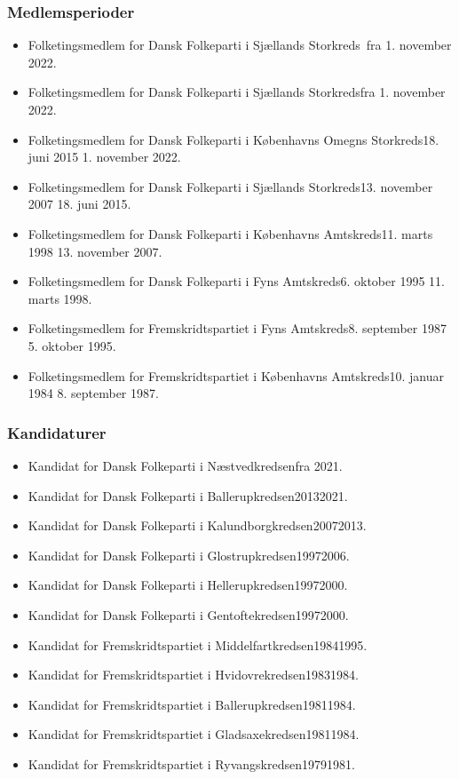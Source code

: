 \documentclass[11pt, a4paper]{awesome-cv}
\begin{document}
\begin{cvletter}
\subsubsection*{Medlemsperioder}
\begin{itemize}
\item Folketingsmedlem for Dansk Folkeparti i Sjællands Storkreds fra 1. november 2022.
\item Folketingsmedlem for Dansk Folkeparti i Sjællands Storkredsfra 1. november 2022.
\item Folketingsmedlem for Dansk Folkeparti i Københavns Omegns Storkreds18. juni 2015  1. november 2022.
\item Folketingsmedlem for Dansk Folkeparti i Sjællands Storkreds13. november 2007  18. juni 2015.
\item Folketingsmedlem for Dansk Folkeparti i Københavns Amtskreds11. marts 1998  13. november 2007.
\item Folketingsmedlem for Dansk Folkeparti i Fyns Amtskreds6. oktober 1995  11. marts 1998.
\item Folketingsmedlem for Fremskridtspartiet i Fyns Amtskreds8. september 1987  5. oktober 1995.
\item Folketingsmedlem for Fremskridtspartiet i Københavns Amtskreds10. januar 1984  8. september 1987.
\end{itemize}
\subsubsection*{Kandidaturer}
\begin{itemize}
\item Kandidat for Dansk Folkeparti i Næstvedkredsenfra 2021.
\item Kandidat for Dansk Folkeparti i Ballerupkredsen20132021.
\item Kandidat for Dansk Folkeparti i Kalundborgkredsen20072013.
\item Kandidat for Dansk Folkeparti i Glostrupkredsen19972006.
\item Kandidat for Dansk Folkeparti i Hellerupkredsen19972000.
\item Kandidat for Dansk Folkeparti i Gentoftekredsen19972000.
\item Kandidat for Fremskridtspartiet i Middelfartkredsen19841995.
\item Kandidat for Fremskridtspartiet i Hvidovrekredsen19831984.
\item Kandidat for Fremskridtspartiet i Ballerupkredsen19811984.
\item Kandidat for Fremskridtspartiet i Gladsaxekredsen19811984.
\item Kandidat for Fremskridtspartiet i Ryvangskredsen19791981.
\end{itemize}

\end{cvletter}
\end{document}
